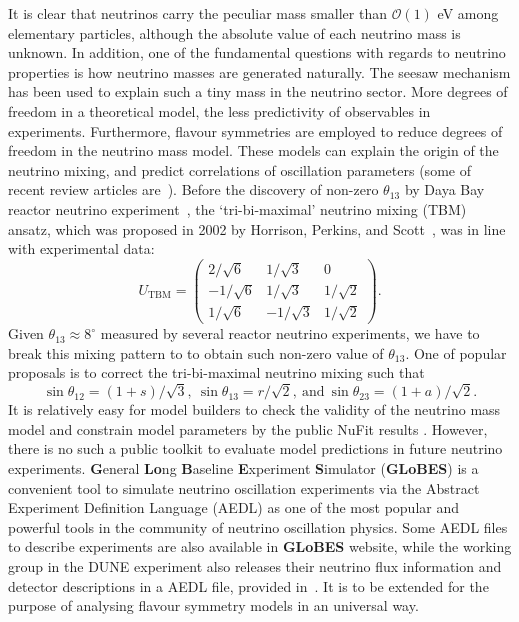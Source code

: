 \documentclass[aps,prd,nofootinbib,preprint]{revtex4}
\begin{document}
It is clear that neutrinos carry the peculiar mass smaller than $\mathcal{O}(1)$ eV among elementary particles, although the absolute value of each neutrino mass is unknown. In addition, one of the fundamental questions with regards to neutrino properties is how neutrino masses are generated naturally. 
The seesaw mechanism has been used to explain such a tiny mass in the neutrino sector. 
More degrees of freedom in a theoretical model, the less predictivity of observables in experiments. Furthermore, flavour symmetries are employed to reduce degrees of freedom in the neutrino mass model. These models can explain the origin of the neutrino mixing, and predict correlations of oscillation parameters (some of recent review articles are~\cite{Altarelli:2010gt,Ishimori:2010au,King:2013eh,King:2014nza,King:2015aea,King:2015ata,King:2017guk}). Before the discovery of non-zero $\theta_{13}$ by Daya Bay reactor neutrino experiment~\cite{An:2013zwz}, the `tri-bi-maximal' neutrino mixing (TBM) ansatz, which was proposed in 2002 by Horrison, Perkins, and Scott~\cite{Harrison:2002er}, was in line with experimental data:
\begin{equation*}
U_{\text{TBM}}=\left(
\begin{array}{ccc}
2/\sqrt{6} & 1/\sqrt{3} & 0\\
-1/\sqrt{6} & 1/\sqrt{3} & 1/\sqrt{2}\\
1/\sqrt{6}  & -1/\sqrt{3} & 1/\sqrt{2}
\end{array}\right).
\end{equation*} 
Given $\theta_{13}\approx 8^\circ$ measured by several reactor neutrino experiments, we have to break this mixing pattern to to obtain such non-zero value of $\theta_{13}$. One of popular proposals is to correct the tri-bi-maximal neutrino mixing such that 
\begin{equation*}
\sin\theta_{12}=(1+s)/\sqrt{3},~\sin\theta_{13}=r/\sqrt{2},~\text{and}~\sin\theta_{23}=(1+a)/\sqrt{2}.
\end{equation*}
It is relatively easy for model builders to check the validity of the neutrino mass model and constrain model parameters by the public NuFit results \cite{Esteban:2018azc}. However, there is no such a public toolkit to evaluate model predictions in future neutrino experiments. \textbf{G}eneral \textbf{Lo}ng \textbf{B}aseline \textbf{E}xperiment \textbf{S}imulator (\textbf{GLoBES}) \cite{Huber:2004ka,Huber:2007ji} is a convenient tool to simulate neutrino oscillation experiments via the Abstract Experiment Definition Language (AEDL) as one of the most popular and powerful tools in the community of neutrino oscillation physics. Some AEDL files to describe experiments are also available in \textbf{GLoBES} website, while the working group in the DUNE experiment also releases their neutrino flux information and detector descriptions in a AEDL file, provided in~\cite{Alion:2016uaj}. It is to be extended for the purpose of analysing flavour symmetry models in an universal way. 
\end{document}
